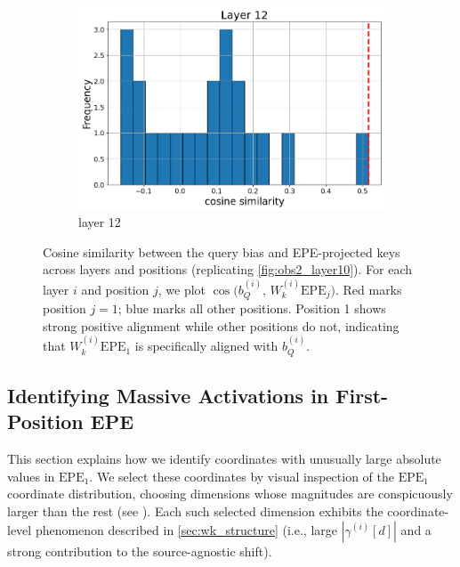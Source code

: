 \documentclass[11pt]{article}
\begin{document}
\begin{figure}[t]
\begin{subfigure}[t]{0.24\textwidth}
    \includegraphics[width=1.4\columnwidth]{figures/obs2_appendix/obs2_layer12.png}
    \caption{layer 12}
  \end{subfigure}\hfill
    \vspace{2mm}

  \caption{Cosine similarity between the query bias and EPE-projected keys across layers and positions (replicating \cref{fig:obs2_layer10}). For each layer $i$ and position $j$, we plot $\cos\big(b_Q^{(i)},\, W_k^{(i)}\mathrm{EPE}_j\big)$. Red marks position $j{=}1$; blue marks all other positions. Position 1 shows strong positive alignment while other positions do not, indicating that $W_k^{(i)}\mathrm{EPE}_1$ is specifically aligned with $b_Q^{(i)}$.}
  \label{fig:appendix_obs2_all_layers}
\end{figure}

\subsection{Identifying Massive Activations in First-Position EPE}\label{app:massive_activations_in_ppe}

This section explains how we identify coordinates with unusually large absolute values in $\mathrm{EPE}_1$. We select these coordinates by visual inspection of the $\mathrm{EPE}_1$ coordinate distribution, choosing dimensions whose magnitudes are conspicuously larger than the rest (see ). Each such selected dimension exhibits the coordinate-level phenomenon described in \cref{sec:wk_structure} (i.e., large $|\gamma^{(i)}[d]|$ and a strong contribution to the source-agnostic shift).
\end{document}
